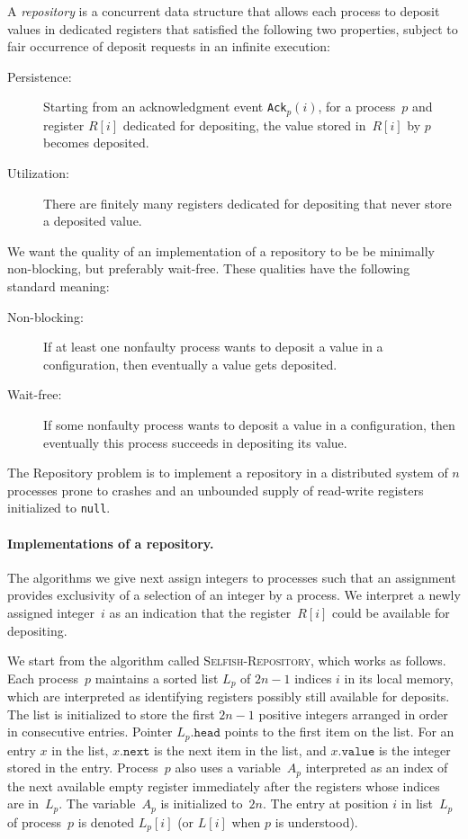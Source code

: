 \documentclass[11pt]{article}
\newcommand{\BBB}{\vspace*{-\bigskipamount}}
\newcommand{\Paragraph}[1]{\BBB\paragraph{#1}}
\begin{document}
A \emph{repository} is a concurrent data structure that allows each process to deposit  values in dedicated registers that satisfied the following two properties, subject to fair occurrence  of deposit requests  in an infinite execution:
\begin{description}
\item[\sf Persistence:]  
Starting from an acknowledgment event  \texttt{Ack}$_p(i)$, for a process~$p$ and register $R[i]$ dedicated for depositing, the value stored in~$R[i]$ by $p$ becomes deposited. 
\item[\sf Utilization:] 
There are finitely many registers dedicated for depositing that never store a deposited value.
\end{description}

We want the quality of an implementation of a repository to be be minimally non-blocking, but preferably wait-free.
These qualities have the following standard meaning:
\begin{description}
\item[\sf Non-blocking:] 
If at least one nonfaulty process wants to deposit a value in a configuration, then eventually a value gets deposited.
\item[\sf Wait-free:] 
If some nonfaulty process wants to deposit a value in a configuration, then eventually this process succeeds in depositing its value.
\end{description}
The Repository problem is to implement a repository in a distributed system of $n$ processes prone to crashes and an unbounded supply of read-write registers initialized to \texttt{null}.





\Paragraph{Implementations of a repository.} 




The algorithms we give next assign integers to processes such that an assignment provides exclusivity of a selection of an integer by a process.
We interpret a newly assigned integer~$i$ as an indication that the register~$R[i]$ could be  available for depositing.

We start from the algorithm called \textsc{Selfish-Repository}, which works as follows.
Each process~$p$ maintains a sorted list $L_p$ of $2n-1$ indices $i$ in its local memory, which are interpreted as identifying registers possibly still available for deposits.
The list is initialized to store the first $2n-1$ positive integers arranged in order in consecutive entries.
Pointer $L_p.\texttt{head}$ points to the first item on the list.
For an entry $x$ in the list, $x.\texttt{next}$ is the next item in the list, and $x.\texttt{value}$ is the integer stored in the entry.
Process~$p$ also  uses a variable~$A_p$ interpreted as an index of the next available empty register immediately after the registers whose indices are in~$L_p$.
The variable~$A_p$ is initialized to~$2n$.
The entry at position $i$ in list~$L_p$ of process~$p$ is denoted $L_p[i]$ (or $L[i]$ when $p$ is understood).
\end{document}
